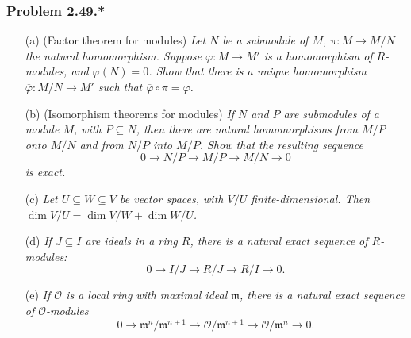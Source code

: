 \documentclass{article}
\begin{document}



\subsubsection*{Problem 2.49.*}
\begin{enumerate}
\item[(a)]
  (Factor theorem for modules)
  \emph{Let $N$ be a submodule of $M$, $\pi: M \to M/N$ the natural homomorphism.
  Suppose $\varphi: M \to M'$ is a homomorphism of $R$-modules, and $\varphi(N) = 0$.
  Show that there is a unique homomorphism $\overline{\varphi}: M/N \to M'$
  such that $\overline{\varphi} \circ \pi = \varphi$.}

\item[(b)]
  (Isomorphism theorems for modules)
  \emph{If $N$ and $P$ are submodules of a module $M$, with $P \subseteq N$,
  then there are natural homomorphisms from $M/P$ onto $M/N$ and from $N/P$ into $M/P$.
  Show that the resulting sequence
  \[
    0 \to N/P \to M/P \to M/N \to 0
  \]
  is exact.}

\item[(c)]
  \emph{Let $U \subseteq W \subseteq V$ be vector spaces,
  with $V/U$ finite-dimensional.
  Then $\dim V/U = \dim V/W + \dim W/U$.}

\item[(d)]
  \emph{If $J \subseteq I$ are ideals in a ring $R$,
  there is a natural exact sequence of $R$-modules:}
  \[
    0 \to I/J \to R/J \to R/I \to 0.
  \]

\item[(e)]
  \emph{If $\mathscr{O}$ is a local ring with maximal ideal $\mathfrak{m}$,
  there is a natural exact sequence of $\mathscr{O}$-modules}
  \[
    0
    \to \mathfrak{m}^{n}/\mathfrak{m}^{n+1}
    \to \mathscr{O}/\mathfrak{m}^{n+1}
    \to \mathscr{O}/\mathfrak{m}^{n}
    \to
    0.
  \] \\
\end{enumerate}
\end{document}
